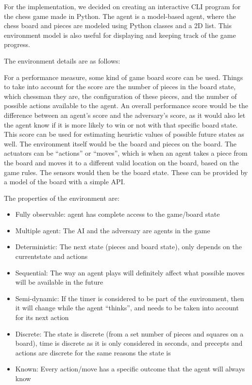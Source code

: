 \documentclass[12pt, letterpaper]{article}
\begin{document}
\medskip

For the implementation, we decided on creating an interactive CLI program for the chess game made
in Python. The agent is a model-based agent, where the chess board and pieces are modeled using
Python classes and a 2D list. This environment model is also useful for displaying and keeping track of
the game progress.

\bigskip

The environment details are as follows:

\medskip

For a performance measure, some kind of game board score can be used. Things to take into account
for the score are the number of pieces in the board state, which chessman they are, the configuration
of these pieces, and the number of possible actions available to the agent. An overall performance
score would be the difference between an agent's score and the adversary's score, as it would also
let the agent know if it is more likely to win or not with that specific board state. This score can
be used for estimating heuristic values of possible future states as well. The environment itself
would be the board and pieces on the board. The actuators can be “actions” or “moves”, which is when an
agent takes a piece from the board and moves it to a different valid location on the board, based on
the game rules. The sensors would then be the board state. These can be provided by a model of the board
with a simple API.

\clearpage

The properties of the environment are:
\begin{itemize}
  \item Fully observable: agent has complete access to the game/board state
  \item Multiple agent: The AI and the adversary are agents in the game
  \item Deterministic: The next state (pieces and board state), only depends
  on the currentstate and actions
  \item Sequential: The way an agent plays will definitely affect what possible
  moves will be available in the future
  \item Semi-dynamic: If the timer is considered to be part of the environment,
  then it will change while the agent “thinks”, and needs to be taken into account
  for its next action
  \item Discrete: The state is discrete (from a set number of pieces and squares
  on a board), time is discrete as it is only considered in seconds, and precepts
  and actions are discrete for the same reasons the state is
  \item Known: Every action/move has a specific outcome that the agent will always know
\end{itemize}
\end{document}

